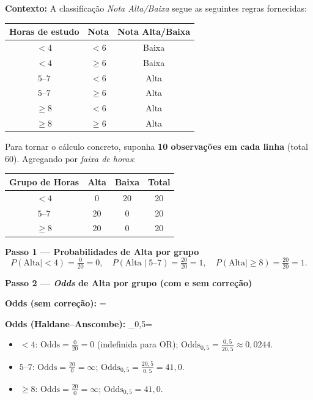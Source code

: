 \begin{SolvedBox}
\textbf{Contexto:} A classificação \emph{Nota Alta/Baixa} segue as seguintes regras fornecidas: \\
\begin{tabular}{@{}c|c|c@{}}\toprule
Horas de estudo & Nota & Nota Alta/Baixa \\\midrule
$<4$   & $<6$   & Baixa \\
$<4$   & $\ge 6$& Baixa \\
$5$--$7$ & $<6$   & Alta \\
$5$--$7$ & $\ge 6$& Alta \\
$\ge 8$  & $<6$   & Alta \\
$\ge 8$  & $\ge 6$& Alta \\\bottomrule
\end{tabular}

\medskip
Para tornar o cálculo concreto, suponha \textbf{10 observações em cada linha} (total 60). Agregando por \emph{faixa de horas}:

\begin{center}
\begin{tabular}{@{}c|c|c|c@{}}\toprule
Grupo de Horas & Alta & Baixa & Total \\\midrule
$<4$     & 0  & 20 & 20 \\
$5$--$7$ & 20 & 0  & 20 \\
$\ge 8$  & 20 & 0  & 20 \\\bottomrule
\end{tabular}
\end{center}

\textbf{Passo 1 — Probabilidades de Alta por grupo}
\[
P(\text{Alta}\mid <4)=\tfrac{0}{20}=0,\quad
P(\text{Alta}\mid 5\text{--}7)=\tfrac{20}{20}=1,\quad
P(\text{Alta}\mid \ge 8)=\tfrac{20}{20}=1.
\]

\textbf{Passo 2 — \emph{Odds} de Alta por grupo (com e sem correção)}
\begin{FormulaBox}
\textbf{Odds (sem correção):}\;\; =
\end{FormulaBox}

\begin{FormulaBox}
\textbf{Odds (Haldane–Anscombe):}\;\; _{0{,}5}=
\end{FormulaBox}

\begin{itemize}[leftmargin=*]
\item $<4$: $\mathrm{Odds}=\tfrac{0}{20}=0$ (indefinida para OR); \quad
      $\mathrm{Odds}_{0{,}5}=\tfrac{0{,}5}{20{,}5}\approx 0{,}0244$.
\item $5$--$7$: $\mathrm{Odds}=\tfrac{20}{0}=\infty$; \quad
      $\mathrm{Odds}_{0{,}5}=\tfrac{20{,}5}{0{,}5}=41{,}0$.
\item $\ge 8$: $\mathrm{Odds}=\tfrac{20}{0}=\infty$; \quad
      $\mathrm{Odds}_{0{,}5}=41{,}0$.
\end{itemize}
\end{SolvedBox}



